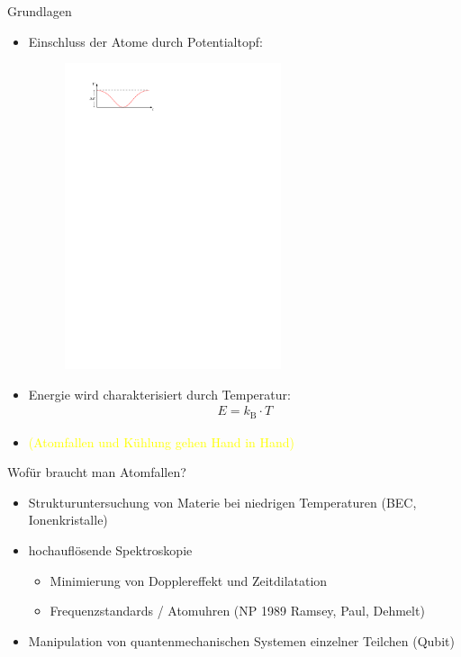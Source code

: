 \documentclass[12pt,xcolor=dvipsnames]{beamer}
\newcommand{\korr}[1]{{\textcolor{Yellow}{(#1)}}}
\begin{document}
\begin{frame}{Grundlagen}
	\begin{itemize}
		\item Einschluss der Atome durch Potentialtopf:
			\begin{figure}
				\centering
				\includegraphics[width=0.6\textwidth]{./figures/fallentiefe.pdf}
			\end{figure}
		\item Energie wird charakterisiert durch Temperatur:
		\begin{align}
		E = k_\mathrm{B} \cdot T
		\end{align}
		
		\item \korr{Atomfallen und Kühlung gehen Hand in Hand}
		
	\end{itemize}

\end{frame}

\begin{frame}{Wofür braucht man Atomfallen?}
	\begin{itemize}
		\item Strukturuntersuchung von Materie bei niedrigen Temperaturen (BEC, Ionenkristalle)
		
		\item hochauflösende Spektroskopie
			\begin{itemize}
				\item Minimierung von Dopplereffekt und Zeitdilatation
				\item Frequenzstandards / Atomuhren (NP 1989 Ramsey, Paul, Dehmelt)
			\end{itemize}
		
		\item Manipulation von quantenmechanischen Systemen einzelner Teilchen (Qubit)
	\end{itemize}
\end{frame}
\end{document}
